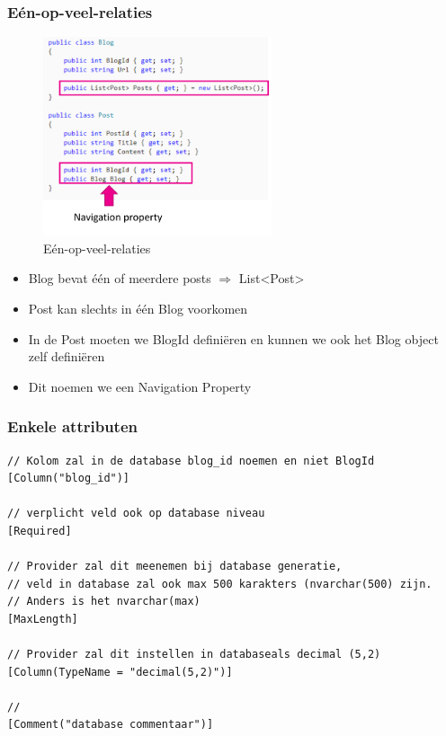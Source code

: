 \documentclass{article}
\begin{document}
\subsubsection{Eén-op-veel-relaties}

\begin{figure}[H]
    \centering
    \includegraphics[width=0.6\textwidth]{efcore-model-eenopveel.png}
    \caption{Eén-op-veel-relaties}
\end{figure}


\begin{itemize}
    \item Blog bevat één of meerdere posts $\Rightarrow$ List<Post>
    \item Post kan slechts in één Blog voorkomen
    \item In de Post moeten we BlogId definiëren en kunnen we ook het Blog object zelf definiëren
    \item Dit noemen we een Navigation Property
\end{itemize}

\subsubsection{Enkele attributen}

\begin{verbatim}
// Kolom zal in de database blog_id noemen en niet BlogId
[Column("blog_id")] 

// verplicht veld ook op database niveau
[Required]

// Provider zal dit meenemen bij database generatie, 
// veld in database zal ook max 500 karakters (nvarchar(500) zijn. 
// Anders is het nvarchar(max)
[MaxLength]  

// Provider zal dit instellen in databaseals decimal (5,2)
[Column(TypeName = "decimal(5,2)")]  

//
[Comment("database commentaar")]  
\end{verbatim}
\end{document}
